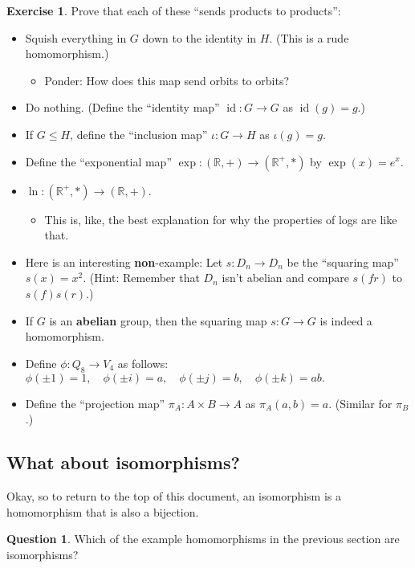 \documentclass[12pt]{article}
\theoremstyle{definition} %
\newtheorem*{question}{Question}
\newtheorem*{exercise}{Exercise}
\newcommand{\R}{\mathbb{R}}
\DeclareMathOperator{\id}{id}
\begin{document}
\begin{exercise} Prove that each of these ``sends products to products'':
    \begin{itemize}
        \item Squish everything in $G$ down to the identity in $H$. (This is a rude homomorphism.)
        \begin{itemize}
            \item Ponder: How does this map send orbits to orbits?
        \end{itemize}
        \item Do nothing. (Define the ``identity map'' $\id:G\to G$ as $\id(g) = g$.)
        \item If $G \leq H$, define the ``inclusion map'' $\iota:G\to H$ as $\iota(g) = g$.
        \item Define the ``exponential map'' $\exp:(\R, +) \to (\R^+, *)$ by $\exp(x) = e^x$.
        \item $\ln:(\R^+, *) \to (\R, +)$.
        \begin{itemize}
            \item This is, like, the best explanation for why the properties of logs are like that.
        \end{itemize}
        \item Here is an interesting \textbf{non}-example: Let $s:D_n \to D_n$ be the ``squaring map'' $s(x) = x^2$. (Hint: Remember that $D_n$ isn't abelian and compare $s(fr)$ to $s(f) s(r)$.)
        \item If $G$ is an \textbf{abelian} group, then the squaring map $s:G\to G$ is indeed a homomorphism.
        \item Define $\phi:Q_8 \to V_4$ as follows: $\phi(\pm 1) = 1, \quad \phi(\pm i) = a, \quad \phi(\pm j) = b, \quad \phi(\pm k) = ab.$
        \item Define the ``projection map'' $\pi_A:A\times B \to A$ as $\pi_A(a,b) = a$. (Similar for $\pi_B$.)
    \end{itemize}
\end{exercise}

\subsection*{What about isomorphisms?}

Okay, so to return to the top of this document, an isomorphism is a homomorphism that is also a bijection. 

\begin{question}
    Which of the example homomorphisms in the previous section are isomorphisms?
\end{question}
\end{document}
